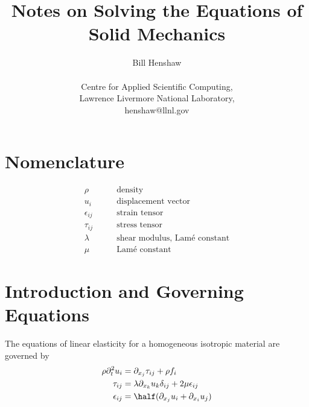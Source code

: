 \documentclass[11pt]{article}
\begin{document}
 
\title{Notes on Solving the Equations of Solid Mechanics}

\author{
Bill Henshaw \\
\  \\
Centre for Applied Scientific Computing, \\
Lawrence Livermore National Laboratory, \\
henshaw@llnl.gov }
 
\maketitle

\tableofcontents

\section{Nomenclature}
\begin{align}
  \rho & \qquad \mbox{density} \\
  u_i & \qquad \mbox{displacement vector} \\
  \epsilon_{ij} & \qquad \mbox{strain tensor} \\
  \tau_{ij} & \qquad \mbox{stress tensor} \\
  \lambda & \qquad \mbox{shear modulus, Lam\'e constant} \\
  \mu & \qquad \mbox{Lam\'e constant}
\end{align}



\clearpage 
\section{Introduction and Governing Equations}

The equations of linear elasticity for a homogeneous isotropic material are governed by
\begin{align}
  \rho \partial_t^2 u_i &= \partial_{x_j} \tau_{ij} + \rho f_i \\
  \tau_{ij} &= \lambda \partial_{x_k} u_k \delta_{ij} + 2 \mu \epsilon_{ij} \\
  \epsilon_{ij} &= \half( \partial_{x_j} u_i + \partial_{x_i} u_j )
\end{align}
\end{document}
